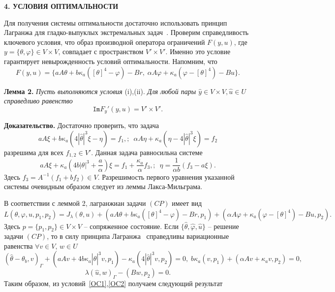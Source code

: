 \documentclass[12pt]{article}
\begin{document}
    \begin{center}
        \textbf{4. УСЛОВИЯ ОПТИМАЛЬНОСТИ}
    \end{center}

    Для получения системы оптимальности достаточно использовать
    принцип Лагранжа для гладко-выпуклых экстремальных задач~\cite{10,11}.
    Проверим справедливость ключевого условия, что образ производной
    оператора ограничений $F(y, u)$, где $y=\{\theta,\varphi\}\in V\times V$,
    совпадает с пространством $V'\times V'.$ Именно это условие гарантирует
    невырожденность условий оптимальности.
    Напомним, что
    \[
        F(y, u) = \{ aA\theta + b \kappa_a ( [\theta]^4- \varphi) - Br,\;
        \alpha A \varphi + \kappa_a (\varphi -[\theta]^4) - Bu\}.
    \]


    \textbf{Лемма 2.}
    {\it
        Пусть выполняются условия} (i),(ii).
    {\it Для любой пары $\hat{y} \in V \times V, \hat{u} \in U$ справедливо равенство}
    \[
        \texttt{Im}F_y'(y, u) = V' \times V'.
    \]


    {\bf Доказательство.} Достаточно проверить, что задача
    \[
        aA \xi + b \kappa_a (4|\hat{\theta}|^3 \xi - \eta) = f_1, ;\ \;
        \alpha A \eta + \kappa_a (\eta - 4|\hat{\theta}|^3 \xi) = f_2
    \]
    разрешима для всех $f_{1,2}\in V'.$ Данная задача равносильна системе
    \[
        aA\xi + \kappa_a\left(4b|\theta|^3 + \frac{a}{\alpha}\right) \xi = f_1
        +\frac{\kappa_a}{\alpha}f_3, ;\ \;
        \eta =\frac{1}{\alpha b}( f_3-a\xi).
    \]
    Здесь $f_3=A^{-1}(f_1+bf_2)\in V.$ Разрешимость первого уравнения указанной системы очевидным образом следует из леммы Лакса-Мильграма.


    В соответствии с леммой 2, лагранжиан задачи $(CP)$ имеет вид
    \[
        L(\theta, \varphi, u, p_1, p_2) = J_\lambda(\theta, u)
        + (aA\theta + b\kappa_a([\theta]^4 - \varphi) - Br, p_1)
        + (\alpha A \varphi + \kappa_a(\varphi - [\theta]^4) - Bu, p_2).
    \]
    Здесь $p=\{p_1,p_2\}\in V\times V$ -- сопряженное состояние.
    Если $\{\hat{\theta}, \hat{\varphi}, \hat{u} \}$ -- решение задачи $(CP)$, то
    в силу принципа Лагранжа~\cite[Теорема 1.5]{10} справедливы вариационные равенства
    $\forall v\in V,\, w\in U$
    \begin{equation}
        \label{OC1}
        (\hat{\theta} -\theta_b, v)_\Gamma + (aAv + 4 b\kappa_a |\hat{\theta}|^3v, p_1)
        - \kappa_a ( 4 |\hat{\theta}|^3v, p_2) = 0,\;
        b \kappa_a (v, p_1)+ (\alpha A v + \kappa_a v, p_2) = 0,
    \end{equation}
    \begin{equation}
        \label{OC2}
        \lambda(\hat{u},w)_\Gamma - (Bw, p_2) = 0.
    \end{equation}
    Таким образом, из условий~\eqref{OC1},\eqref{OC2}
    получаем следующий результат
\end{document}
